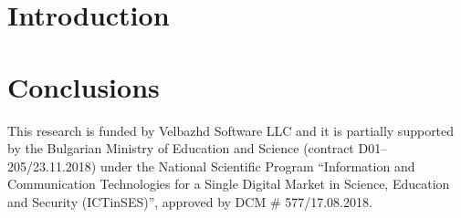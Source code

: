 \documentclass[graybox]{svmult}
\begin{document}
\section{Introduction}
\label{sec:01}

\section{Conclusions}
\label{sec:02}

\begin{acknowledgement}
This research is funded by Velbazhd Software LLC and it is partially supported by the Bulgarian Ministry of Education and Science (contract D01–205/23.11.2018) under the National Scientific Program ``Information and Communication Technologies for a Single Digital Market in Science, Education and Security (ICTinSES)'', approved by DCM \# 577/17.08.2018.
\end{acknowledgement}


\end{document}
